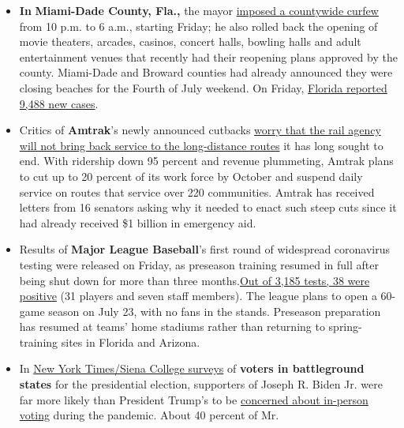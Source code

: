 \begin{itemize}
\item
  \textbf{In} \textbf{Miami-Dade County, Fla.,} the mayor
  \href{https://www.miamidade.gov/releases/2020-07-02-mayor-covid-measures.asp}{imposed
  a countywide curfew} from 10 p.m. to 6 a.m., starting Friday; he also
  rolled back the opening of movie theaters, arcades, casinos, concert
  halls, bowling halls and adult entertainment venues that recently had
  their reopening plans approved by the county. Miami-Dade and Broward
  counties had already announced they were closing beaches for the
  Fourth of July weekend. On Friday,
  \href{https://experience.arcgis.com/experience/7572b118dc3c48d885d1c643c195314e/}{Florida
  reported 9,488 new cases}.
\item
  Critics of \textbf{Amtrak}'s newly announced cutbacks
  \href{https://www.nytimes3xbfgragh.onion/2020/07/03/us/coronavirus-amtrak-cuts.html}{worry
  that the rail agency will not bring back service to the long-distance
  routes} it has long sought to end. With ridership down 95 percent and
  revenue plummeting, Amtrak plans to cut up to 20 percent of its work
  force by October and suspend daily service on routes that service over
  220 communities. Amtrak has received letters from 16 senators asking
  why it needed to enact such steep cuts since it had already received
  \$1 billion in emergency aid.
\item
  Results of \textbf{Major League Baseball}'s first round of widespread
  coronavirus testing were released on Friday, as preseason training
  resumed in full after being shut down for more than three
  months.\href{https://www.nytimes3xbfgragh.onion/2020/07/03/sports/baseball/mlb-workouts-first-practices-boston-red-sox.html}{Out
  of 3,185 tests, 38 were positive} (31 players and seven staff
  members). The league plans to open a 60-game season on July 23, with
  no fans in the stands. Preseason preparation has resumed at teams'
  home stadiums rather than returning to spring-training sites in
  Florida and Arizona.
\item
  In
  \href{https://www.nytimes3xbfgragh.onion/2020/06/25/upshot/poll-2020-biden-battlegrounds.html}{New
  York Times/Siena College surveys} of \textbf{voters in battleground
  states} for the presidential election, supporters of Joseph R. Biden
  Jr. were far more likely than President Trump's to be
  \href{https://www.nytimes3xbfgragh.onion/2020/07/03/upshot/biden-supporters-are-more-worried-about-the-health-risks-of-voting.html}{concerned
  about in-person voting} during the pandemic. About 40 percent of Mr.

\end{itemize}
